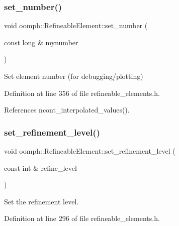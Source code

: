 \subsubsection{\texorpdfstring{set\+\_\+number()}{set\_number()}}
{\footnotesize\ttfamily void oomph\+::\+Refineable\+Element\+::set\+\_\+number (\begin{DoxyParamCaption}\item[{const long \&}]{mynumber }\end{DoxyParamCaption})\hspace{0.3cm}{\ttfamily [inline]}}



Set element number (for debugging/plotting) 



Definition at line 356 of file refineable\+\_\+elements.\+h.



References ncont\+\_\+interpolated\+\_\+values().

\mbox{\label{classoomph_1_1RefineableElement_a3b8879c7bcebdd70ffa94dbbf8203be1}} 
\subsubsection{\texorpdfstring{set\+\_\+refinement\+\_\+level()}{set\_refinement\_level()}}
{\footnotesize\ttfamily void oomph\+::\+Refineable\+Element\+::set\+\_\+refinement\+\_\+level (\begin{DoxyParamCaption}\item[{const int \&}]{refine\+\_\+level }\end{DoxyParamCaption})\hspace{0.3cm}{\ttfamily [inline]}}



Set the refinement level. 



Definition at line 296 of file refineable\+\_\+elements.\+h.

\mbox{\label{classoomph_1_1RefineableElement_acd004aa826f0249007b63d573e9b8b36}} 
